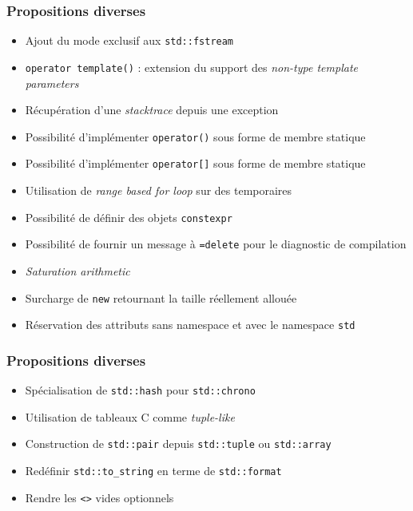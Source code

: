 \documentclass[C++.tex]{subfiles}
\begin{document}
\begin{frame}[fragile]
	\frametitle{Propositions diverses}
	\begin{itemize}
		\item Ajout du mode exclusif aux \lstinline|std::fstream|
		\item \lstinline|operator template()| : extension du support des \textit{non-type template parameters}
		\item Récupération d'une \textit{stacktrace} depuis une exception
		\item Possibilité d'implémenter \lstinline|operator()| sous forme de membre statique
		\item Possibilité d'implémenter \lstinline|operator[]| sous forme de membre statique
		\item Utilisation de \textit{range based for loop} sur des temporaires
		\item Possibilité de définir des objets \lstinline|constexpr|
		\item Possibilité de fournir un message à \lstinline|=delete| pour le diagnostic de compilation
		\item \textit{Saturation arithmetic}
		

		\item Surcharge de \lstinline|new| retournant la taille réellement allouée
		\item Réservation des attributs sans namespace et avec le namespace \lstinline|std|


	\end{itemize}
\end{frame}

\begin{frame}[fragile]
	\frametitle{Propositions diverses}
	\begin{itemize}
		\item Spécialisation de \lstinline|std::hash| pour \lstinline|std::chrono|
		\item Utilisation de tableaux C comme \textit{tuple-like}


		\item Construction de \lstinline|std::pair| depuis \lstinline|std::tuple| ou \lstinline|std::array|
		\item Redéfinir \lstinline|std::to_string| en terme de \lstinline|std::format|
		\item Rendre les \lstinline|<>| vides optionnels
	\end{itemize}
\end{frame}
				
\end{document}
